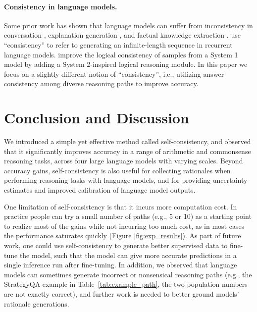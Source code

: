 \documentclass{article} %
\begin{document}
\vspace{-0.12in}
\paragraph{Consistency in language models.}
Some prior work has shown that language models can suffer from inconsistency in conversation \citep{adiwardana2020humanlike}, 
explanation generation \citep{camburu-etal-2020-make},
and factual knowledge extraction \citep{elazar-etal-2021-measuring}.
\cite{welleck-etal-2020-consistency} use ``consistency'' to refer to generating an infinite-length sequence in recurrent language models.
\cite{nye2021improving} improve the logical consistency of samples from a System 1 model by adding a System 2-inspired logical reasoning module.
In this paper we focus on a slightly different notion of ``consistency'', i.e., utilizing answer consistency among diverse reasoning paths to improve accuracy.


\section{Conclusion and Discussion}
We introduced a simple yet effective method called self-consistency, and observed that it significantly improves accuracy in a range of arithmetic and commonsense reasoning tasks, across four large language models with varying scales.
Beyond accuracy gains, self-consistency is also useful for collecting rationales when performing reasoning tasks with language models, and for providing uncertainty estimates and improved calibration of language model outputs.

One limitation of self-consistency is that it incurs more computation cost. 
In practice people can try a small number of paths (e.g., 5 or 10) as a starting point to realize most of the gains while not incurring too much cost, as in most cases the performance saturates quickly (Figure \ref{fig:exp_results}). As part of future work, one could use self-consistency to generate better supervised data to fine-tune the model, such that the model can give more accurate predictions in a single inference run after fine-tuning.
In addition, we observed that language models can sometimes generate incorrect or nonsensical reasoning paths (e.g., the StrategyQA example in Table~\ref{tab:example_path}, the two population numbers are not exactly correct), and further work is needed to better ground models' rationale generations.

\clearpage
\end{document}
